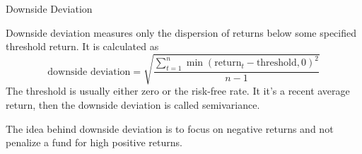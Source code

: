 \documentclass[../custom,grid]{flashcards}
\begin{document}
\begin{flashcard}{Downside Deviation}
    \begin{flushleft}
        Downside deviation measures only the dispersion of returns below some specified threshold return. It is calculated as
        \[
            \text{downside deviation} = \sqrt{\frac{\sum_{t=1}^n \min(\text{return}_t - \text{threshold}, 0)^2}{n - 1}}
        \]
        The threshold is usually either zero or the risk-free rate. It it's a recent average return, then the downside deviation is called semivariance.\newline

        The idea behind downside deviation is to focus on negative returns and not penalize a fund for high positive returns.
    \end{flushleft}
\end{flashcard}
\end{document}
